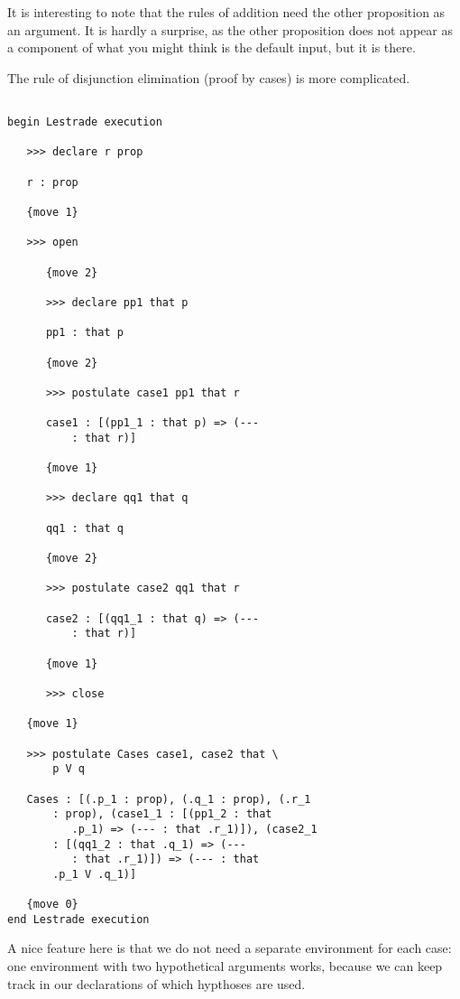 \documentclass[12pt]{article}
\begin{document}
It is interesting to note that the rules of addition need the other proposition as an argument.  It is hardly a surprise,
as the other proposition does not appear as a component of what you might think is the default input, but it is there.

The rule of disjunction elimination (proof by cases) is more complicated.

\begin{verbatim}

begin Lestrade execution

   >>> declare r prop

   r : prop

   {move 1}

   >>> open

      {move 2}

      >>> declare pp1 that p

      pp1 : that p

      {move 2}

      >>> postulate case1 pp1 that r

      case1 : [(pp1_1 : that p) => (--- 
          : that r)]

      {move 1}

      >>> declare qq1 that q

      qq1 : that q

      {move 2}

      >>> postulate case2 qq1 that r

      case2 : [(qq1_1 : that q) => (--- 
          : that r)]

      {move 1}

      >>> close

   {move 1}

   >>> postulate Cases case1, case2 that \
       p V q

   Cases : [(.p_1 : prop), (.q_1 : prop), (.r_1 
       : prop), (case1_1 : [(pp1_2 : that 
          .p_1) => (--- : that .r_1)]), (case2_1 
       : [(qq1_2 : that .q_1) => (--- 
          : that .r_1)]) => (--- : that 
       .p_1 V .q_1)]

   {move 0}
end Lestrade execution

\end{verbatim}

A nice feature here is that we do not need a separate environment for each case:  one environment with two hypothetical arguments works, because we can keep track in our declarations of which hypthoses are used.
\end{document}
